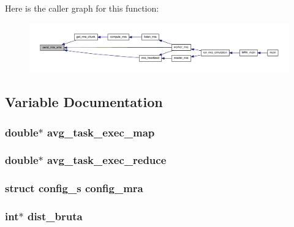 \-Here is the caller graph for this function\-:\nopagebreak
\begin{figure}[H]
\begin{center}
\leavevmode
\includegraphics[width=350pt]{common-mra_8h_a305ac8e3389f94106990aa3c52c91416_icgraph}
\end{center}
\end{figure}




\subsection{\-Variable \-Documentation}
\hypertarget{common-mra_8h_afc43959c8dc45a0582a605a20e83aa0d}{
\subsubsection[{avg\-\_\-task\-\_\-exec\-\_\-map}]{\setlength{\rightskip}{0pt plus 5cm}double$\ast$ {\bf avg\-\_\-task\-\_\-exec\-\_\-map}}}\label{common-mra_8h_afc43959c8dc45a0582a605a20e83aa0d}
\hypertarget{common-mra_8h_ad5b90869efe31de6176f099e9cf99de5}{
\subsubsection[{avg\-\_\-task\-\_\-exec\-\_\-reduce}]{\setlength{\rightskip}{0pt plus 5cm}double$\ast$ {\bf avg\-\_\-task\-\_\-exec\-\_\-reduce}}}\label{common-mra_8h_ad5b90869efe31de6176f099e9cf99de5}
\hypertarget{common-mra_8h_a1860c3de3eef8309ccc6b068eb3a08f6}{
\subsubsection[{config\-\_\-mra}]{\setlength{\rightskip}{0pt plus 5cm}struct {\bf config\-\_\-s}  {\bf config\-\_\-mra}}}\label{common-mra_8h_a1860c3de3eef8309ccc6b068eb3a08f6}
\hypertarget{common-mra_8h_a25cc609dae2875ebd3e01dec54626409}{
\subsubsection[{dist\-\_\-bruta}]{\setlength{\rightskip}{0pt plus 5cm}int$\ast$ {\bf dist\-\_\-bruta}}}\label{common-mra_8h_a25cc609dae2875ebd3e01dec54626409}


